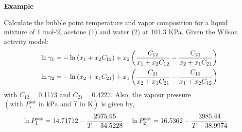    \begin{MyExample}{\begin{center}{\bf Example}\end{center}}
     \begin{example}\label{Chapter:SolutionThermodynamics:Example6} %
         Calculate the bubble point temperature and vapor composition for a liquid mixture of 1 mol-$\%$ acetone (1) and water (2) at 101.3 KPa. Given the Wilson activity model:
   \begin{eqnarray}
       &&\ln\gamma_{1} = -\ln\left(x_{1}+x_{2}C_{12}\right) + x_{2}\left(\displaystyle\frac{C_{12}}{x_{1}+x_{2}C_{12}}-\displaystyle\frac{C_{21}}{x_{2}+x_{1}C_{21}}\right) \nonumber \\
       &&\ln\gamma_{2} = -\ln\left(x_{2}+x_{1}C_{21}\right) + x_{1}\left(\displaystyle\frac{C_{21}}{x_{2}+x_{1}C_{21}}-\displaystyle\frac{C_{12}}{x_{1}+x_{2}C_{12}}\right) \nonumber
   \end{eqnarray}
   with $C_{12}=$0.1173 and $C_{21}=$0.4227. Also, the vapour pressure $\left(\text{with } P_{i}^{\text{sat}}\text{ in kPa and } T\text{ in K}\right)$ is given by,
\begin{displaymath}
   \ln P_{1}^{\text{sat}} = 14.71712 - \displaystyle\frac{2975.95}{T-34.5228} \;\;\;\; \ln P_{2}^{\text{sat}} = 16.5362 - \displaystyle\frac{3985.44}{T-38.9974}
\end{displaymath}
     \end{example}

            


\end{MyExample}
